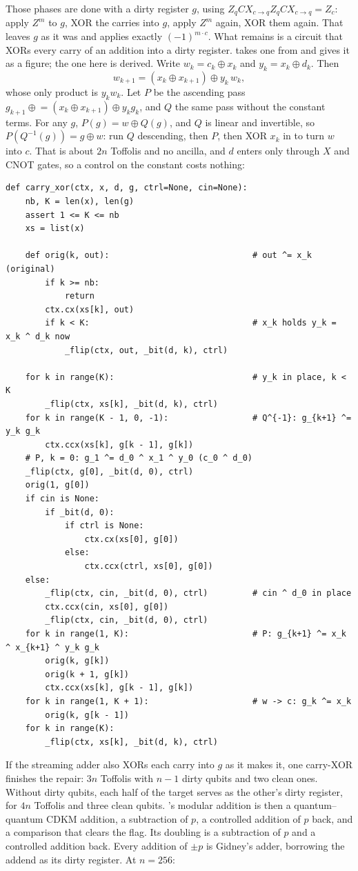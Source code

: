 \documentclass[11pt]{article}
\theoremstyle{plain}
\theoremstyle{remark}
\begin{document}
Those phases are done with a dirty register $g$, using $Z_qCX_{c\to q}Z_qCX_{c\to q}=Z_c$: apply
$Z^m$ to $g$, XOR the carries into $g$, apply $Z^m$ again, XOR them again. That leaves $g$ as it was
and applies exactly $(-1)^{m\cdot c}$. What remains is a circuit that XORs every carry of an addition
into a dirty register. \cite{ec:gidney25} takes one from \cite{ec:hrs17} and gives it as a figure;
the one here is derived. Write $w_k=c_k\oplus x_k$ and $y_k=x_k\oplus d_k$. Then
$$w_{k+1}=(x_k\oplus x_{k+1})\oplus y_k\,w_k,$$
whose only product is $y_kw_k$. Let $P$ be the ascending pass $g_{k+1}\mathrel{\oplus}=
(x_k\oplus x_{k+1})\oplus y_kg_k$, and $Q$ the same pass without the constant terms. For any $g$,
$P(g)=w\oplus Q(g)$, and $Q$ is linear and invertible, so $P(Q^{-1}(g))=g\oplus w$: run $Q$
descending, then $P$, then XOR $x_k$ in to turn $w$ into $c$. That is about $2n$ Toffolis and no
ancilla, and $d$ enters only through $X$ and CNOT gates, so a control on the constant costs nothing:
\begin{lstlisting}
def carry_xor(ctx, x, d, g, ctrl=None, cin=None):
    nb, K = len(x), len(g)
    assert 1 <= K <= nb
    xs = list(x)

    def orig(k, out):                             # out ^= x_k (original)
        if k >= nb:
            return
        ctx.cx(xs[k], out)
        if k < K:                                 # x_k holds y_k = x_k ^ d_k now
            _flip(ctx, out, _bit(d, k), ctrl)

    for k in range(K):                            # y_k in place, k < K
        _flip(ctx, xs[k], _bit(d, k), ctrl)
    for k in range(K - 1, 0, -1):                 # Q^{-1}: g_{k+1} ^= y_k g_k
        ctx.ccx(xs[k], g[k - 1], g[k])
    # P, k = 0: g_1 ^= d_0 ^ x_1 ^ y_0 (c_0 ^ d_0)
    _flip(ctx, g[0], _bit(d, 0), ctrl)
    orig(1, g[0])
    if cin is None:
        if _bit(d, 0):
            if ctrl is None:
                ctx.cx(xs[0], g[0])
            else:
                ctx.ccx(ctrl, xs[0], g[0])
    else:
        _flip(ctx, cin, _bit(d, 0), ctrl)         # cin ^ d_0 in place
        ctx.ccx(cin, xs[0], g[0])
        _flip(ctx, cin, _bit(d, 0), ctrl)
    for k in range(1, K):                         # P: g_{k+1} ^= x_k ^ x_{k+1} ^ y_k g_k
        orig(k, g[k])
        orig(k + 1, g[k])
        ctx.ccx(xs[k], g[k - 1], g[k])
    for k in range(1, K + 1):                     # w -> c: g_k ^= x_k
        orig(k, g[k - 1])
    for k in range(K):
        _flip(ctx, xs[k], _bit(d, k), ctrl)
\end{lstlisting}
If the streaming adder also XORs each carry into $g$ as it makes it, one carry-XOR finishes the
repair: $3n$ Toffolis with $n-1$ dirty qubits and two clean ones. Without dirty qubits, each half of
the target serves as the other's dirty register, for $4n$ Toffolis and three clean qubits.
\cite{ec:luo26}'s modular addition is then a quantum--quantum CDKM addition, a subtraction of $p$,
a controlled addition of $p$ back, and a comparison that clears the flag. Its doubling is a
subtraction of $p$ and a controlled addition back. Every addition of $\pm p$ is Gidney's adder,
borrowing the addend as its dirty register. At $n=256$:
\end{document}
